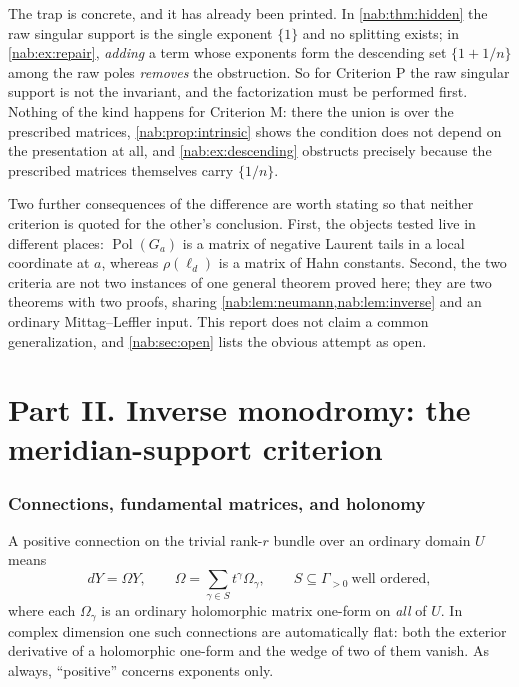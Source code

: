 \documentclass[11pt,letterpaper]{article}
\theoremstyle{definition}
\theoremstyle{remark}
\newcommand{\Pol}{\operatorname{Pol}}
\numberwithin{equation}{section}
\begin{document}
\medskip
The trap is concrete, and it has already been printed. In
\cref{nab:thm:hidden} the raw singular support is the single exponent $\{1\}$
and no splitting exists; in \cref{nab:ex:repair}, \emph{adding} a term whose
exponents form the descending set $\{1+1/n\}$ among the raw poles
\emph{removes} the obstruction. So for Criterion P the raw singular support is
not the invariant, and the factorization must be performed first. Nothing of
the kind happens for Criterion M: there the union is over the prescribed
matrices, \cref{nab:prop:intrinsic} shows the condition does not depend on the
presentation at all, and \cref{nab:ex:descending} obstructs precisely because
the prescribed matrices themselves carry $\{1/n\}$.

Two further consequences of the difference are worth stating so that neither
criterion is quoted for the other's conclusion. First, the objects tested live
in different places: $\Pol(G_a)$ is a matrix of negative Laurent tails in a
local coordinate at $a$, whereas $\rho(\ell_d)$ is a matrix of Hahn constants.
Second, the two criteria are not two instances of one general theorem proved
here; they are two theorems with two proofs, sharing
\cref{nab:lem:neumann,nab:lem:inverse} and an ordinary Mittag--Leffler input.
This report does not claim a common generalization, and
\cref{nab:sec:open} lists the obvious attempt as open.
\part*{Part II. Inverse monodromy: the meridian-support criterion}

\section{Connections, fundamental matrices, and holonomy}
\label{nab:sec:holonomy}

A positive connection on the trivial rank-$r$ bundle over an ordinary domain
$U$ means
\begin{equation}\label{nab:eq:connection}
 dY=\Omega Y,\qquad
 \Omega=\sum_{\gamma\in S}t^\gamma\Omega_\gamma,
 \qquad S\subseteq\Gamma_{>0}\ \text{well ordered},
\end{equation}
where each $\Omega_\gamma$ is an ordinary holomorphic matrix one-form on
\emph{all} of $U$. In complex dimension one such connections are automatically
flat: both the exterior derivative of a holomorphic one-form and the wedge of
two of them vanish. As always, ``positive'' concerns exponents only.
\end{document}
